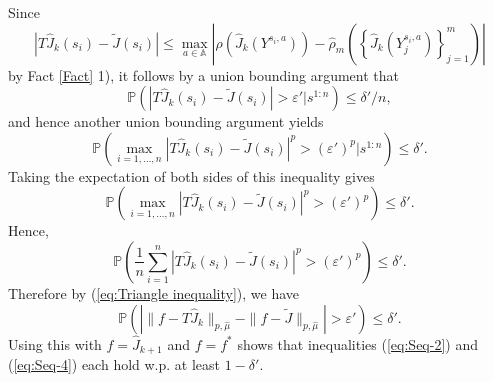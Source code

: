 \documentclass[12pt,technote,onecolumn]{IEEEtran}
\begin{document}
\begin{IEEEproof}
	Since
	\[
	\left|T\widehat{J}_{k}\left(s_{i}\right)-\widetilde{J}\left(s_{i}\right)\right|\leq\max_{a\in\mathbb{A}}\left|\rho\left(\widehat{J}_k\left(Y^{s_i,a}\right)\right)-\hat{\rho}_{m}\left(\left\{\widehat{J}_k\left(Y_j^{s_i,a}\right)\right\}^m_{j=1}\right)\right|
	\]
	by Fact \ref{Fact} 1), it follows by a union bounding argument that
	\[
	\mathbb{P}\left(\left|T\widehat{J}_{k}\left(s_{i}\right)-\widetilde{J}\left(s_{i}\right)\right|>\varepsilon'\big|s^{1:n}\right)\leq\delta'/n,
	\]
	and hence another union bounding argument yields
	\[
	\mathbb{P}\left(\max_{i=1,\dots,n}\left|T\widehat{J}_{k}\left(s_{i}\right)-\widetilde{J}\left(s_{i}\right)\right|^{p}>\left(\varepsilon'\right)^{p}\big|s^{1:n}\right)\leq\delta'.
	\]
	Taking the expectation of both sides of this inequality gives
	\[
	\mathbb{P}\left(\max_{i=1,\dots,n}\left|T\widehat{J}_{k}\left(s_{i}\right)-\widetilde{J}\left(s_{i}\right)\right|^{p}>\left(\varepsilon'\right)^{p}\right)\leq\delta'.
	\]
	Hence,
	\[
	\mathbb{P}\left(\frac{1}{n}\sum_{i=1}^{n}\left|T\widehat{J}_{k}\left(s_{i}\right)-\widetilde{J}\left(s_{i}\right)\right|^{p}>\left(\varepsilon'\right)^{p}\right)\leq\delta'.
	\]
	Therefore by (\ref{eq:Triangle inequality}), we have
	\[
	\mathbb{P}\left(\left|\|f-T\widehat{J}_{k}\|_{p,\hat{\mu}}-\|f-\widetilde{J}\|_{p,\hat{\mu}}\right|>\varepsilon'\right)\leq\delta'.
	\]
	Using this with $f=\widehat{J}_{k+1}$ and $f=f^{*}$ shows that inequalities
	(\ref{eq:Seq-2}) and (\ref{eq:Seq-4}) each hold w.p. at least $1-\delta'$. 
\end{IEEEproof}
\end{document}
